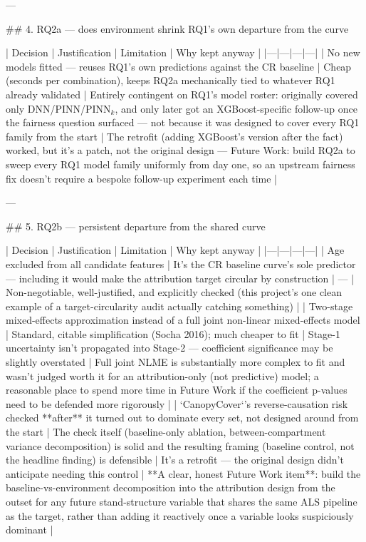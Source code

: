 ---

## 4. RQ2a — does environment shrink RQ1's own departure from the curve

| Decision | Justification | Limitation | Why kept anyway |
|---|---|---|---|
| No new models fitted — reuses RQ1's own predictions against the CR baseline | Cheap (seconds per combination), keeps RQ2a mechanically tied to whatever RQ1 already validated | Entirely contingent on RQ1's model roster: originally covered only DNN/PINN/PINN$_k$, and only later got an XGBoost-specific follow-up once the fairness question surfaced — not because it was designed to cover every RQ1 family from the start | The retrofit (adding XGBoost's version after the fact) worked, but it's a patch, not the original design — Future Work: build RQ2a to sweep every RQ1 model family uniformly from day one, so an upstream fairness fix doesn't require a bespoke follow-up experiment each time |

---

## 5. RQ2b — persistent departure from the shared curve

| Decision | Justification | Limitation | Why kept anyway |
|---|---|---|---|
| Age excluded from all candidate features | It's the CR baseline curve's sole predictor — including it would make the attribution target circular by construction | — | Non-negotiable, well-justified, and explicitly checked (this project's one clean example of a target-circularity audit actually catching something) |
| Two-stage mixed-effects approximation instead of a full joint non-linear mixed-effects model | Standard, citable simplification (Socha 2016); much cheaper to fit | Stage-1 uncertainty isn't propagated into Stage-2 — coefficient significance may be slightly overstated | Full joint NLME is substantially more complex to fit and wasn't judged worth it for an attribution-only (not predictive) model; a reasonable place to spend more time in Future Work if the coefficient p-values need to be defended more rigorously |
| `CanopyCover`'s reverse-causation risk checked **after** it turned out to dominate every set, not designed around from the start | The check itself (baseline-only ablation, between-compartment variance decomposition) is solid and the resulting framing (baseline control, not the headline finding) is defensible | It's a retrofit — the original design didn't anticipate needing this control | **A clear, honest Future Work item**: build the baseline-vs-environment decomposition into the attribution design from the outset for any future stand-structure variable that shares the same ALS pipeline as the target, rather than adding it reactively once a variable looks suspiciously dominant |


